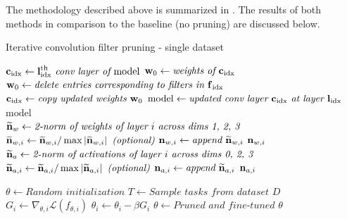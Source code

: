 \documentclass{article}
\begin{document}
The methodology described above is summarized in .
The results of both methods in comparison to the baseline (no pruning) are discussed below.

\begin{algorithm}[t]
	\caption{Iterative convolution filter pruning - single dataset} \label{FilterPruneBasic}
	\begin{algorithmic}[1]
			\State $\bm{\mathrm{c}}_\mathrm{idx} \gets \bm{\mathrm{l}}_\mathrm{idx}^\mathrm{th}\textit{ conv layer of } \mathrm{model}$
			\State $\bm{\mathrm{w}}_0 \gets \textit{weights of  } \bm{\mathrm{c}}_\mathrm{idx}$
			\State $\bm{\mathrm{w}}_0 \gets \textit{delete entries corresponding to filters in }\bm{\mathrm{f}}_\mathrm{idx}$
			\State $\bm{\mathrm{c}}_\mathrm{idx} \gets \textit{copy updated weights }\bm{\mathrm{w}}_0$
			\State $\mathrm{model} \gets \textit{updated conv layer }\bm{\mathrm{c}}_\mathrm{idx} \textit{ at layer }\bm{\mathrm{l}}_\mathrm{idx}$
			\State \Return $\mathrm{model}$
		\EndFunction
		\\
%		
			\State $\widetilde{\bm{\mathrm{n}}}_w \gets \textit{2-norm of weights of layer }i\textit{ across dims 1, 2, 3}$
			\State $\widetilde{\bm{\mathrm{n}}}_{w,i} \gets \widetilde{\bm{\mathrm{n}}}_{w,i} / \max\left \lvert \widetilde{\bm{\mathrm{n}}}_{w,i} \right\rvert \textit{ (optional)}$
			\State $\bm{\mathrm{n}}_{w,i} \gets \textit{append }\widetilde{\bm{\mathrm{n}}}_{w,i}$
		\EndFor
		\State \Return $\bm{\mathrm{n}}_{w,i}$
	\EndFunction
	\\
%	
			\State $\widetilde{\bm{\mathrm{n}}}_a \gets \textit{2-norm of activations of layer }i\textit{ across dims 0, 2, 3}$
			\State $\widetilde{\bm{\mathrm{n}}}_{a,i} \gets \widetilde{\bm{\mathrm{n}}}_{a,i} / \max\left \lvert \widetilde{\bm{\mathrm{n}}}_{a,i} \right\rvert \textit{ (optional)}$
			\State $\bm{\mathrm{n}}_{a,i} \gets \textit{append }\widetilde{\bm{\mathrm{n}}}_{a,i}$
		\EndFor
		\State \Return $\bm{\mathrm{n}}_{a,i}$
	\EndFunction

		\State $\theta \gets \textit{Random initialization}$
		\State $T \gets \textit{Sample tasks from dataset } D$
		\State $G_i \gets \nabla_{\theta,i} \mathcal{L} \left(f_{\theta,i}\right)$
		\State $\theta_i \gets \theta_i - \beta G_i$
		\EndFor
		\State $\theta \gets \textit{Pruned and fine-tuned } \theta$
		\EndFor
	\end{algorithmic}
\end{algorithm}
\end{document}
